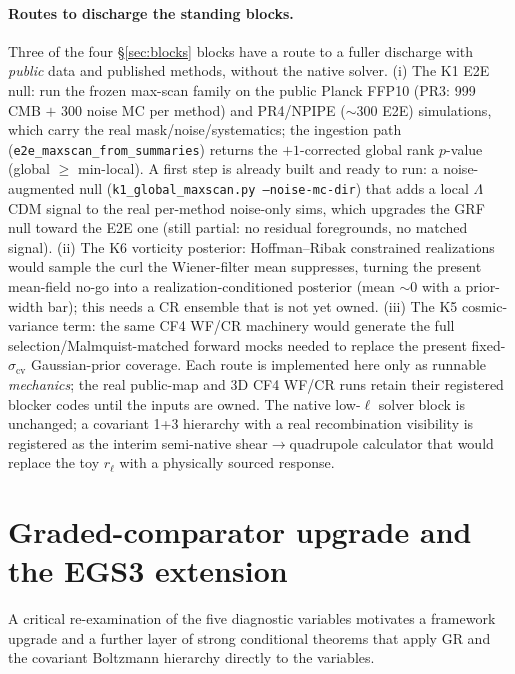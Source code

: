 \documentclass[11pt,a4paper]{article}
\theoremstyle{plain}
\theoremstyle{definition}
\begin{document}
\paragraph{Routes to discharge the standing blocks.} Three of the four
\S\ref{sec:blocks} blocks have a route to a fuller discharge with \emph{public}
data and published methods, without the native solver. (i) The K1 E2E null: run
the frozen max-scan family on the public Planck FFP10 (PR3: 999 CMB $+$ 300 noise
MC per method) and PR4/NPIPE ($\sim300$ E2E) simulations, which carry the real
mask/noise/systematics; the ingestion path
(\texttt{e2e\_maxscan\_from\_summaries}) returns the $+1$-corrected global rank
$p$-value (global $\ge$ min-local). A first step is already built and ready to run:
a noise-augmented null (\texttt{k1\_global\_maxscan.py --noise-mc-dir}) that adds a
local $\Lambda$CDM signal to the real per-method noise-only sims, which upgrades
the GRF null toward the E2E one (still partial: no residual foregrounds, no matched
signal). (ii) The K6 vorticity posterior: Hoffman--Ribak constrained realizations
would sample the curl the Wiener-filter mean suppresses, turning the present
mean-field no-go into a realization-conditioned posterior (mean $\sim0$ with a
prior-width bar); this needs a CR ensemble that is not yet owned. (iii) The K5
cosmic-variance term: the same CF4 WF/CR machinery would generate the full
selection/Malmquist-matched forward mocks needed to replace the present
fixed-$\sigma_{\mathrm{cv}}$ Gaussian-prior coverage. Each route is implemented
here only as runnable \emph{mechanics}; the real public-map and 3D CF4 WF/CR runs
retain their registered blocker codes until the inputs are owned. The native low-$\ell$ solver block is unchanged; a covariant 1+3 hierarchy
with a real recombination visibility is registered as the interim semi-native
shear$\to$quadrupole calculator that would replace the toy $r_\ell$ with a
physically sourced response.

\section{Graded-comparator upgrade and the EGS3 extension}
\label{sec:egs3}

A critical re-examination of the five diagnostic variables motivates a framework
upgrade and a further layer of strong conditional theorems that apply GR and the
covariant Boltzmann hierarchy directly to the variables.
\end{document}
